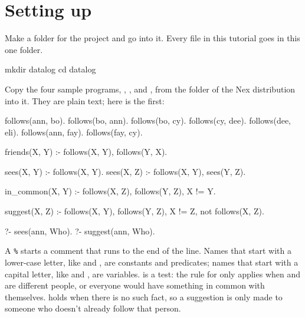 \chapter{Setting up}\label{ch:setup}

Make a folder for the project and go into it. Every file in this tutorial
goes in this one folder.

\begin{shell}
mkdir datalog
cd datalog
\end{shell}

Copy the four sample programs, , ,
 and , from the 
folder of the Nex distribution into it. They are plain text; here is the
first:

\begin{shell}

follows(ann, bo).
follows(bo, ann).
follows(bo, cy).
follows(cy, dee).
follows(dee, eli).
follows(ann, fay).
follows(fay, cy).

friends(X, Y) :- follows(X, Y), follows(Y, X).

sees(X, Y) :- follows(X, Y).
sees(X, Z) :- follows(X, Y), sees(Y, Z).

in_common(X, Y) :- follows(X, Z), follows(Y, Z), X != Y.

suggest(X, Z) :- follows(X, Y), follows(Y, Z), X != Z, not follows(X, Z).

?- sees(ann, Who).
?- suggest(ann, Who).
\end{shell}

A \texttt{\%} starts a comment that runs to the end of the line. Names that
start with a lower-case letter, like  and , are
constants and predicates; names that start with a capital letter, like
 and , are variables.  is a test: the rule
for  only applies when  and  are different
people, or everyone would have something in common with themselves.
 holds when there is no such fact, so a suggestion
is only made to someone who doesn't already follow that person.

